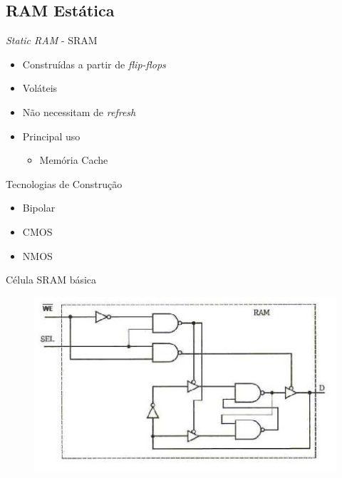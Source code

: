 \documentclass[aspectratio=169,
				xcolor=table]{beamer}
\begin{document}
	\subsection{RAM Estática}
	\begin{frame}{\textit{Static RAM} - SRAM}
		\begin{itemize}
			\item Construídas a partir de \textit{flip-flops}
			\vspace{1em}
			\item Voláteis
			\vspace{1em}
			\item Não necessitam de \textit{refresh}
			\vspace{1em}
			\item Principal uso
			\begin{itemize}
				\item Memória Cache
			\end{itemize}			
		\end{itemize}	
	\end{frame}
	
	\begin{frame}{Tecnologias de Construção}
		\begin{itemize}
			\item Bipolar
			\vspace{1em}
			\item CMOS
			\vspace{1em}
			\item NMOS
		\end{itemize}
	\end{frame}	

	\begin{frame}{Célula SRAM básica}
		\begin{figure}[hbtp]
		\centering
		\includegraphics[height=0.8\textheight, keepaspectratio]{../figs/cap07/celulaSRAM}
		\end{figure}
		
	\end{frame}
\end{document}
